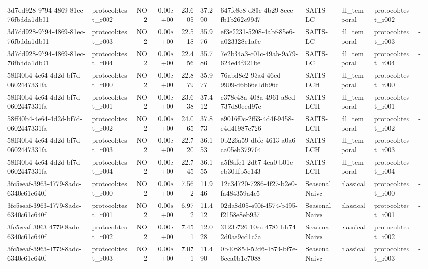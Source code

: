\begin{table}[htbp]
\begin{tabular}{llrrr}
3d7dd928-9794-4869-81ec-76fbdda1db01 & protocol:test\_r002 & NO2 & 0.00e+00 & 23.605 & 37.290 & 647fc8e8-d80c-4b29-8cce-fb1b262c9947 & SAITS-LC & dl\_temporal & protocol:test\_r002 & - \\
3d7dd928-9794-4869-81ec-76fbdda1db01 & protocol:test\_r003 & NO2 & 0.00e+00 & 22.518 & 35.976 & ef3e2231-5208-4abf-85e6-a023328c1a0c & SAITS-LC & dl\_temporal & protocol:test\_r003 & - \\
3d7dd928-9794-4869-81ec-76fbdda1db01 & protocol:test\_r004 & NO2 & 0.00e+00 & 22.456 & 35.786 & 7e2b34a3-c01c-49ab-9a79-624ed4f321be & SAITS-LC & dl\_temporal & protocol:test\_r004 & - \\
58ff40b4-4e64-4d2d-bf7d-0602447331fa & protocol:test\_r000 & NO2 & 0.00e+00 & 22.879 & 35.977 & 76abd8e2-93a4-46cd-9909-d6b66e1db96c & SAITS-LCH & dl\_temporal & protocol:test\_r000 & - \\
58ff40b4-4e64-4d2d-bf7d-0602447331fa & protocol:test\_r001 & NO2 & 0.00e+00 & 23.638 & 37.412 & c378e48a-408a-4961-a8ed-737d80eed97e & SAITS-LCH & dl\_temporal & protocol:test\_r001 & - \\
58ff40b4-4e64-4d2d-bf7d-0602447331fa & protocol:test\_r002 & NO2 & 0.00e+00 & 24.065 & 37.873 & e9016f0c-2f53-4d4f-9458-e4d41987c726 & SAITS-LCH & dl\_temporal & protocol:test\_r002 & - \\
58ff40b4-4e64-4d2d-bf7d-0602447331fa & protocol:test\_r003 & NO2 & 0.00e+00 & 22.720 & 36.153 & 0b226a59-dbfe-4613-a0a6-ca05eb379704 & SAITS-LCH & dl\_temporal & protocol:test\_r003 & - \\
58ff40b4-4e64-4d2d-bf7d-0602447331fa & protocol:test\_r004 & NO2 & 0.00e+00 & 22.745 & 36.155 & a5f8afe1-2d67-4ea0-b01e-cb30dfb5e143 & SAITS-LCH & dl\_temporal & protocol:test\_r004 & - \\
3fc5eeaf-3963-4779-8adc-6340c61c640f & protocol:test\_r000 & NO2 & 0.00e+00 & 7.562 & 11.946 & 12c3d720-7286-4f27-b2e0-fa484359a4c5 & SeasonalNaive & classical & protocol:test\_r000 & - \\
3fc5eeaf-3963-4779-8adc-6340c61c640f & protocol:test\_r001 & NO2 & 0.00e+00 & 6.972 & 11.412 & 02da8d05-e90f-4574-b495-f2158e8eb937 & SeasonalNaive & classical & protocol:test\_r001 & - \\
3fc5eeaf-3963-4779-8adc-6340c61c640f & protocol:test\_r002 & NO2 & 0.00e+00 & 7.451 & 12.028 & 3123e726-10ce-4783-bb74-2d0ae9cd1c3a & SeasonalNaive & classical & protocol:test\_r002 & - \\
3fc5eeaf-3963-4779-8adc-6340c61c640f & protocol:test\_r003 & NO2 & 0.00e+00 & 7.071 & 11.490 & 0b408854-52d6-4876-bf7e-6cca0b1e7088 & SeasonalNaive & classical & protocol:test\_r003 & - \\

\end{tabular}
\end{table}
